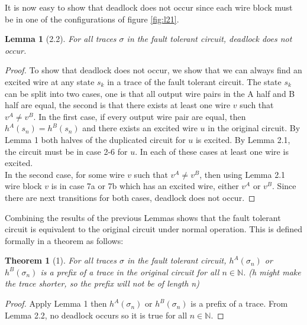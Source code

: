 \documentclass[12pt]{report}
\newtheorem*{theorem}{Theorem}
\newtheorem*{lemma}{Lemma}
\begin{document}
It is now easy to show that deadlock does not occur since each wire block must be in one of the configurations of figure \ref{fig:l21}.
\begin{lemma}[2.2]
For all traces $\sigma$ in the fault tolerant circuit, deadlock does not occur.
\end{lemma}
\begin{proof}
To show that deadlock does not occur, we show that we can always find an excited wire at any state $s_k$ in a trace of the fault tolerant circuit.  The state $s_k$ can be split into two cases, one is that all output wire pairs in the A half and B half are equal, the second is that there exists at least one wire $v$ such that $v^A\neq v^B$.  In the first case, if every output wire pair are equal, then $h^A(s_n)=h^B(s_n)$ and there exists an excited wire $u$ in the original circuit.  By Lemma 1 both halves of the duplicated circuit for $u$ is excited.  By Lemma 2.1, the circuit must be in case 2-6 for $u$.  In each of these cases at least one wire is excited.  \\
In the second case, for some wire $v$ such that $v^A\neq v^B$, then using Lemma 2.1 wire block $v$ is in case 7a or 7b which has an excited wire, either $v^A$ or $v^B$.  Since there are next transitions for both cases, deadlock does not occur.
\end{proof}

Combining the results of the previous Lemmas shows that the fault tolerant circuit is equivalent to the original circuit under normal operation.  This is defined formally in a theorem as follows:
\begin{theorem}[1]
For all traces $\sigma$ in the fault tolerant circuit, $h^{A}(\sigma_n)$ or $h^{B}(\sigma_n)$ is a prefix of a trace in the original circuit for all $n \in \mathbb{N}$.  (h might make the trace shorter, so the prefix will not be of length n) %
\end{theorem}
\begin{proof}
Apply Lemma 1 then $h^{A}(\sigma_n)$ or $h^{B}(\sigma_n)$ is a prefix of a trace.  From Lemma 2.2, no deadlock occurs so it is true for all $n\in \mathbb{N}$.
\end{proof}
\end{document}

